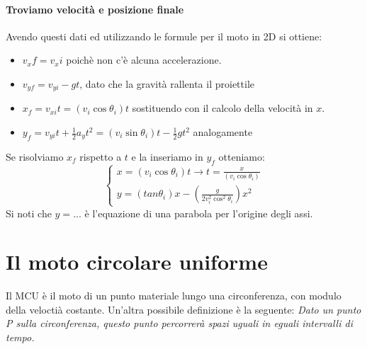 \documentclass[12pt, a4paper, openany]{book}
\begin{document}
\paragraph*{Troviamo velocità e posizione finale}
Avendo questi dati ed utilizzando le formule per il moto in 2D si ottiene:
\begin{itemize}
    \item $v_xf = v_xi$ poichè non c'è alcuna accelerazione.
    \item $v_{yf} = v_{yi} - gt$, dato che la gravità rallenta il proiettile
\end{itemize}
\begin{itemize}
    \item $x_f = v_{xi}t = (v_i \cos \theta_i) t$ sostituendo con il calcolo della velocità in $x$.
    \item $y_f = v_{yi}t + \frac{1}{2} a_yt^2 = (v_i \sin \theta_i)t - \frac{1}{2} gt^2$ analogamente
\end{itemize}
Se risolviamo $x_f$ rispetto a $t$ e la inseriamo in $y_f$ otteniamo:
\[
    \begin{cases}
        x = (v_i \cos \theta_i) t \to t = \frac{x}{(v_i \cos \theta_i)} \\
        y = (tan \theta_i) x- (\frac{g}{2v_i^2\cos^2 \theta_i})x^2
    \end{cases}
\]
Si noti che $y=...$ è l'equazione di una parabola per l'origine degli assi.


\section*{Il moto circolare uniforme}
Il MCU è il moto di un punto materiale lungo una circonferenza, con modulo della veloctià costante.
Un'altra possibile definizione è la seguente: \emph{Dato un punto P sulla circonferenza, questo punto percorrerà spazi uguali in eguali intervalli di tempo.}
\end{document}
